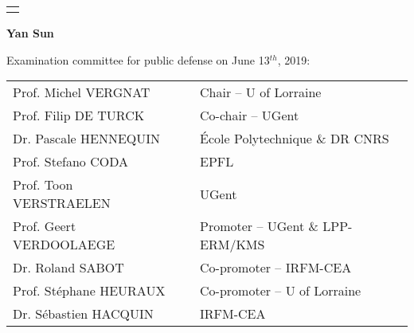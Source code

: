 \begin{titlepage}
\begin{center}
\begin{tabular}{c}



\noalign{\smallskip} \hline \hline \noalign{\smallskip}
\end{tabular}


\vspace{0.4cm}
{\Large
\textbf{Yan Sun}}\\

\vspace{0.4cm}

{\normalsize Examination committee for public defense on June 13$^{th}$, 2019}: \\
\vspace{.4cm}
\begin{tabular}{lcl}
\hline


Prof. Michel \textsc{VERGNAT}  & \hspace{0cm} & Chair --  U of Lorraine \\
Prof. Filip \textsc{DE TURCK} & \hspace{0cm} & Co-chair -- UGent \\
Dr. Pascale \textsc{HENNEQUIN} & \hspace{0cm} & \'{E}cole Polytechnique \& DR CNRS \\
Prof. Stefano \textsc{CODA} & \hspace{0cm} & EPFL \\
Prof. Toon \textsc{VERSTRAELEN} & \hspace{0cm} & UGent \\
Prof. Geert \textsc{VERDOOLAEGE} & \hspace{0cm} & Promoter -- UGent \& LPP-ERM/KMS \\
Dr. Roland \textsc{SABOT}  & \hspace{0cm} & Co-promoter -- IRFM-CEA \\
Prof. St\'{e}phane \textsc{HEURAUX} & \hspace{0cm} & Co-promoter -- U of Lorraine \\
Dr. S\'{e}bastien \textsc{HACQUIN}  & \hspace{0cm} & IRFM-CEA \\



\end{tabular}
\end{center}
\end{titlepage}
